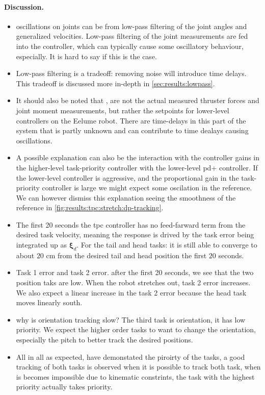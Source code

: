 \paragraph{Discussion.}
\begin{itemize}
    \item oscillations on joints can be from low-pass filtering of the joint angles and generalized velocities. Low-pass filtering of the joint measurements are fed into the controller, which can typically cause some oscillatory behaviour, especially. It is hard to say if this is the case.
    \item Low-pass filtering is a tradeoff: removing noise will introduce time delays. This tradeoff is discussed more in-depth in \autoref{sec:results:lowpass}. 
    \item It should also be noted that , are not the actual measured thruster forces and joint moment measurements, but rather the setpoints for lower-level controllers on the Eelume robot. There are time-delays in this part of the system that is partly unknown and can contribute to time dealays causing oscillations.
    \item A possible explanation can also be the interaction with the controller gains in the higher-level task-priority controller with the lower-level \gls{pd+} controller. If the lower-level controller is aggressive, and the proportional gain in the task-priority controller is large we might expect some oscilation in the reference. We can however dismiss this explanation seeing the smoothness of the reference in \autoref{fig:results:tpc:stretch:dp-tracking}.
    \item The first 20 seconds the tpc controller has no feed-farward term from the desired task velocity, meaning the response is drived by the task error being integrated up as \(\bm{\xi}_d\). For the tail and head tasks: it is still able to converge to about \(20\) cm from the desired tail and head position the first \(20\) seconds. 
    \item Task 1 error and task 2 error. after the first 20 seconds, we see that the two position taks are low. When the robot stretches out, task 2 error increases. We also expect a linear increase in the task 2 error because the head task moves linearly south.
    \item why is orientation tracking slow? The third task is orientation, it has low priority. We expect the higher order tasks to want to change the orientation, especially the pitch to better track the desired positions.
    \item All in all as expected, have demonstated the piroirty of the tasks, a good tracking of both tasks is observed when it is possible to track both task, when is becomes impossible due to kinematic constrints, the task with the highest priority actually takes priority.
\end{itemize}

